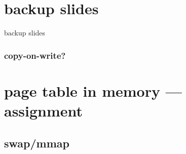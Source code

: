 \date{}
\title{}
\date{}

\begin{frame}
    \titlepage
\end{frame}





\section{backup slides}
\begin{frame}{backup slides}
\end{frame}


\subsubsection{copy-on-write?} %


\section{page table in memory --- assignment}


\subsection{swap/mmap}



